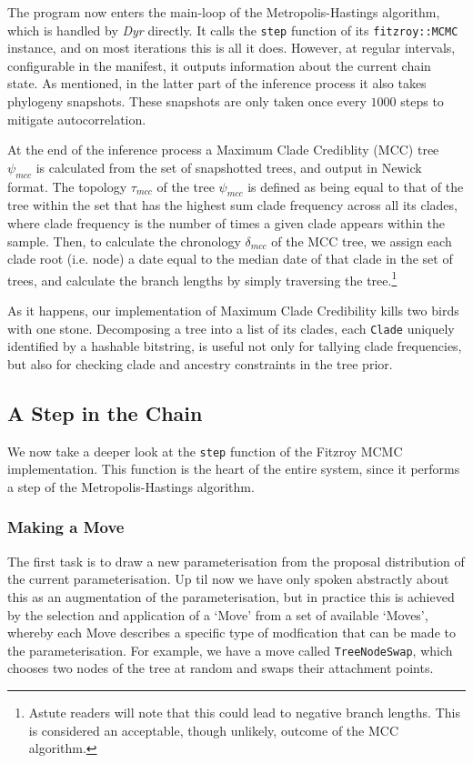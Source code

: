 \documentclass[10pt,journal,compsoc]{IEEEtran}
\begin{document}
The program now enters the main-loop of the Metropolis-Hastings algorithm, which is handled by \textit{Dyr} directly. It calls the \texttt{step} function of its \texttt{fitzroy::MCMC} instance, and on most iterations this is all it does. However, at regular intervals, configurable in the manifest, it outputs information about the current chain state. As mentioned, in the latter part of the inference process it also takes phylogeny snapshots. These snapshots are only taken once every $1000$ steps to mitigate autocorrelation.

At the end of the inference process a Maximum Clade Crediblity (MCC) tree $\psi_{mcc}$ is calculated from the set of snapshotted trees, and output in Newick format. The topology $\tau_{mcc}$ of the tree $\psi_{mcc}$ is defined as being equal to that of the tree within the set that has the highest sum clade frequency across all its clades, where clade frequency is the number of times a given clade appears within the sample. Then, to calculate the chronology $\delta_{mcc}$ of the MCC tree, we assign each clade root (i.e. node) a date equal to the median date of that clade in the set of trees, and calculate the branch lengths by simply traversing the tree.\footnote{Astute readers will note that this could lead to negative branch lengths. This is considered an acceptable, though unlikely, outcome of the MCC algorithm.}

As it happens, our implementation of Maximum Clade Credibility kills two birds with one stone. Decomposing a tree into a list of its clades, each \texttt{Clade} uniquely identified by a hashable bitstring, is useful not only for tallying clade frequencies, but also for checking clade and ancestry constraints in the tree prior.

\subsection{A Step in the Chain}

We now take a deeper look at the \texttt{step} function of the Fitzroy MCMC implementation. This function is the heart of the entire system, since it performs a step of the Metropolis-Hastings algorithm.

\subsubsection{Making a Move}

The first task is to draw a new parameterisation from the proposal distribution of the current parameterisation. Up til now we have only spoken abstractly about this as an augmentation of the parameterisation, but in practice this is achieved by the selection and application of a `Move' from a set of available `Moves', whereby each Move describes a specific type of modfication that can be made to the parameterisation. For example, we have a move called \texttt{TreeNodeSwap}, which chooses two nodes of the tree at random and swaps their attachment points.
\end{document}
